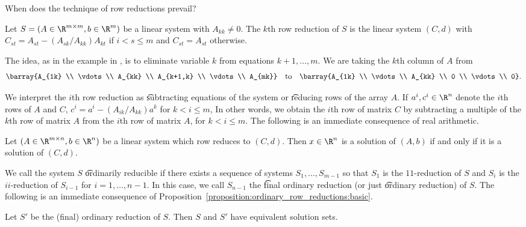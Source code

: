 

When does the technique of row reductions prevail?


Let $S = (A \in \R^{m \times m}, b \in \R^{m})$ be a linear system with $A_{kk} \neq 0$.
The \t{$k$th row reduction} of $S$ is the linear system $(C, d)$ with $C_{st} = A_{st} - (A_{sk}/A_{kk})A_{kt}$ if $i < s \leq m$ and $C_{st} = A_{st}$ otherwise.

The idea, as in the example in , is to eliminate variable $k$ from equations $k+1, \dots, m$.
We are taking the $k$th column of $A$ from
\[
  \barray{A_{1k} \\ \vdots \\ A_{kk} \\ A_{k+1,k} \\ \vdots \\ A_{mk}} \quad \text{to} \quad \barray{A_{1k} \\ \vdots \\ A_{kk} \\ 0 \\ \vdots \\ 0}.
\]

We interpret the $i$th row reduction as \t{subtracting equations} of the system or \t{reducing rows} of the array $A$.
If $a^i, c^i \in \R^{n}$ denote the $i$th rows of $A$ and $C$, $c^i = a^i - (A_{ik}/A_{kk})a^k$ for $k < i \leq m$,
In other words, we obtain the $i$th row of matrix $C$ by subtracting a multiple of the $k$th row of matrix $A$ from the $i$th row of matrix $A$, for $k < i \leq m$.
The following is an immediate consequence of real arithmetic.
\begin{proposition}
  Let $(A \in \R^{m \times n}, b \in \R^{n})$ be a linear system which row reduces to $(C, d)$.
  Then $x \in \R^{n}$ is a solution of $(A, b)$ if and only if it is a solution of $(C, d)$.  \label{proposition:ordinary_row_reductions:basic}
\end{proposition}


We call the system $S$ \t{ordinarily reducible} if there exists a sequence of systems $S_1, \dots, S_{m-1}$ so that $S_1$ is the $11$-reduction of $S$ and $S_{i}$ is the $ii$-reduction of $S_{i-1}$ for $i = 1, \dots, n-1$.
In this case, we call $S_{n-1}$ the \t{final ordinary reduction} (or just \t{ordinary reduction}) of $S$.
The following is an immediate consequence of Proposition~\ref{proposition:ordinary_row_reductions:basic}.
\begin{proposition}
	Let $S'$ be the (final) ordinary reduction of $S$. Then $S$ and $S'$ have equivalent solution sets.
	\label{proposition:ordinary_row_reductions:main}
\end{proposition}

